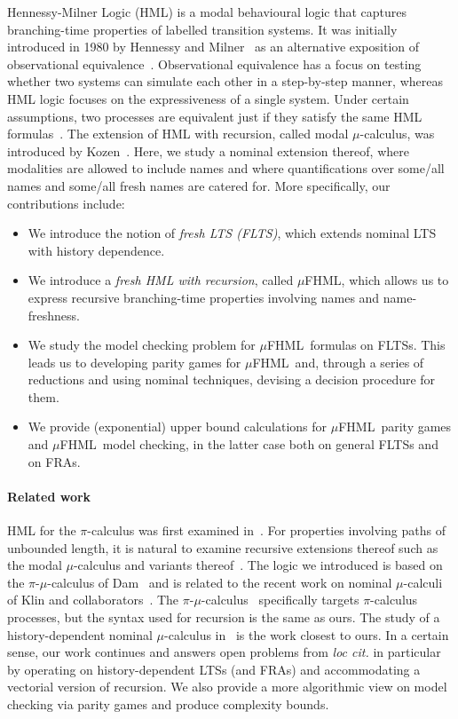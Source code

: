 \documentclass[10pt,a4paper]{article}
\theoremstyle{definition}
\theoremstyle{remark}
\newcommand\fhml[0]{$\mu$FHML}
\begin{document}
Hennessy-Milner Logic (HML) is a modal behavioural logic that captures branching-time properties of labelled transition systems. It was initially introduced in 1980 by Hennessy and Milner~\cite{DBLP:conf/icalp/HennessyM80} as an alternative exposition of observational equivalence~\cite{BradfieldS07}. Observational equivalence has a focus on testing whether two systems can simulate each other in a step-by-step manner,
whereas HML logic focuses on the expressiveness of a single system. Under certain assumptions, two
processes are equivalent just if they satisfy the same HML formulas~\cite{JOB}. The extension of HML with
recursion, called modal $\mu$-calculus, was introduced by Kozen~\cite{Kozen83}.
Here, we study a nominal extension thereof, where modalities
are allowed to include names and where quantifications over some/all names and some/all fresh names are catered for.
More specifically, our contributions include:
\begin{itemize}
\item We introduce the notion of \emph{fresh LTS (FLTS)}, which extends nominal LTS with history dependence.
\item We introduce a \emph{fresh HML with recursion}, called \fhml, which allows us to express recursive branching-time properties involving names and name-freshness.
\item We study the model checking problem for \fhml\ formulas on FLTSs. This leads us to developing parity games for \fhml\ and, through a series of reductions and using nominal techniques, devising a decision procedure for them.
\item We provide (exponential) upper bound calculations for \fhml\ parity games and \fhml\ model checking, in the latter case both on  general FLTSs and on FRAs.
\end{itemize}

\paragraph*{Related work}
HML for the $\pi$-calculus was first examined in~\cite{MilnerPW93}. For properties involving paths
of unbounded length, it is natural to examine recursive extensions thereof such as the modal $\mu$-calculus
and variants thereof~\cite{BradfieldS07}. The logic we introduced is based on the $\pi$-$\mu$-calculus of Dam~\cite{Dam03} and is related to
the recent work on nominal $\mu$-calculi of Klin and collaborators~\cite{KlinL17,KlinL19,KlinHD}.
The $\pi$-$\mu$-calculus~\cite{Dam03} specifically targets $\pi$-calculus processes, but the syntax used for recursion is the same as ours.
The study of a history-dependent nominal $\mu$-calculus in~\cite{KlinHD} is the work closest to ours. In a certain sense, our work continues and answers open problems from \emph{loc cit.}
 in particular by operating on history-dependent LTSs (and FRAs) and accommodating a vectorial version of recursion.
We also provide a more algorithmic view on model checking via parity games and produce complexity bounds. 
\end{document}
